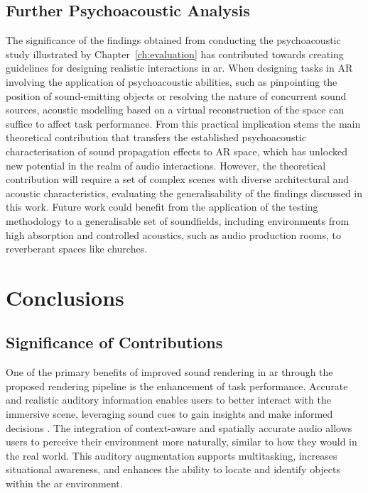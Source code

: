 \subsection{Further Psychoacoustic Analysis}
The significance of the findings obtained from conducting the psychoacoustic study illustrated by Chapter~\ref{ch:evaluation} has contributed towards creating guidelines for designing realistic interactions in \acrshort{ar}. When designing tasks in AR involving the application of psychoacoustic abilities, such as pinpointing the position of sound-emitting objects or resolving the nature of concurrent sound sources, acoustic modelling based on a virtual reconstruction of the space can suffice to affect task performance. From this practical implication stems the main theoretical contribution that transfers the established psychoacoustic characterisation of sound propagation effects to AR space, which has unlocked new potential in the realm of audio interactions. However, the theoretical contribution will require a set of complex scenes with diverse architectural and acoustic characteristics, evaluating the generalisability of the findings discussed in this work. Future work could benefit from the application of the testing methodology to a generalisable set of soundfields, including environments from high absorption and controlled acoustics, such as audio production rooms, to reverberant spaces like churches.\par

\section{Conclusions}
\subsection{Significance of Contributions}
One of the primary benefits of improved sound rendering in \acrshort{ar} through the proposed rendering pipeline is the enhancement of task performance. Accurate and realistic auditory information enables users to better interact with the immersive scene, leveraging sound cues to gain insights and make informed decisions \citep{rubio2017immersive,zimmons2003influence}. The integration of context-aware and spatially accurate audio allows users to perceive their environment more naturally, similar to how they would in the real world. This auditory augmentation supports multitasking, increases situational awareness, and enhances the ability to locate and identify objects within the \acrshort{ar} environment. 

